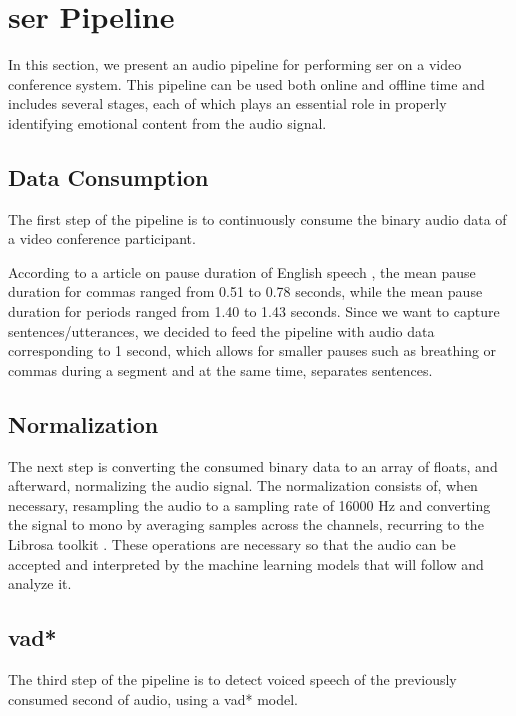 \chapter{\acl{ser} Pipeline}
\label{chapter:ser_conf}

In this section, we present an audio pipeline for performing \ac{ser} on a video conference system. This pipeline can be used both online and offline time and includes several stages, each of which plays an essential role in properly identifying emotional content from the audio signal.

\section{Data Consumption}

The first step of the pipeline is to continuously consume the binary audio data of a video conference participant.

According to a \citeyear{Liu2022} article on pause duration of English speech \cite{Liu2022}, the mean pause duration for commas ranged from 0.51 to 0.78 seconds, while the mean pause duration for periods ranged from 1.40 to 1.43 seconds. Since we want to capture sentences/utterances, we decided to feed the pipeline with audio data corresponding to 1 second, which allows for smaller pauses such as breathing or commas during a segment and at the same time, separates sentences.

\section{Normalization}

The next step is converting the consumed binary data to an array of floats, and afterward, normalizing the audio signal. The normalization consists of, when necessary, resampling the audio to a sampling rate of 16000 Hz and converting the signal to mono by averaging samples across the channels, recurring to the Librosa toolkit \cite{Librosa}. These operations are necessary so that the audio can be accepted and interpreted by the machine learning models that will follow and analyze it.

\section{\acl{vad*}}

The third step of the pipeline is to detect voiced speech of the previously consumed second of audio, using a \ac{vad*} model.

